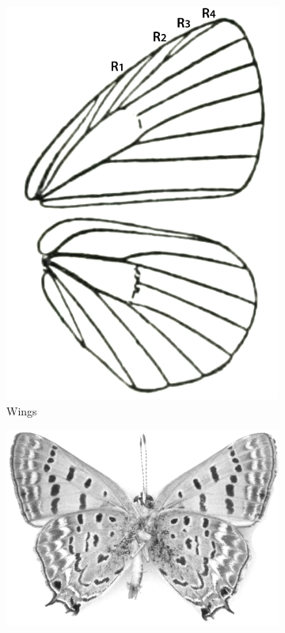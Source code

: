 \documentclass[letterpaper, 11pt]{article}
\begin{document}
\begin{figure}[ht!]
    \centering
    \begin{subfigure}[ht!]{0.27\textwidth}
        \includegraphics[width=\textwidth]{LycaenidWings}
        \caption{Wings \citep[][Fig. 136]{bhl162310}}
        \label{fig:lycaenid1}
    \end{subfigure}
    \hfill %
    \begin{subfigure}[ht!]{0.53\textwidth}
        \includegraphics[width=\textwidth]{lycaenid.png}

\end{subfigure}
\end{figure}
\end{document}
